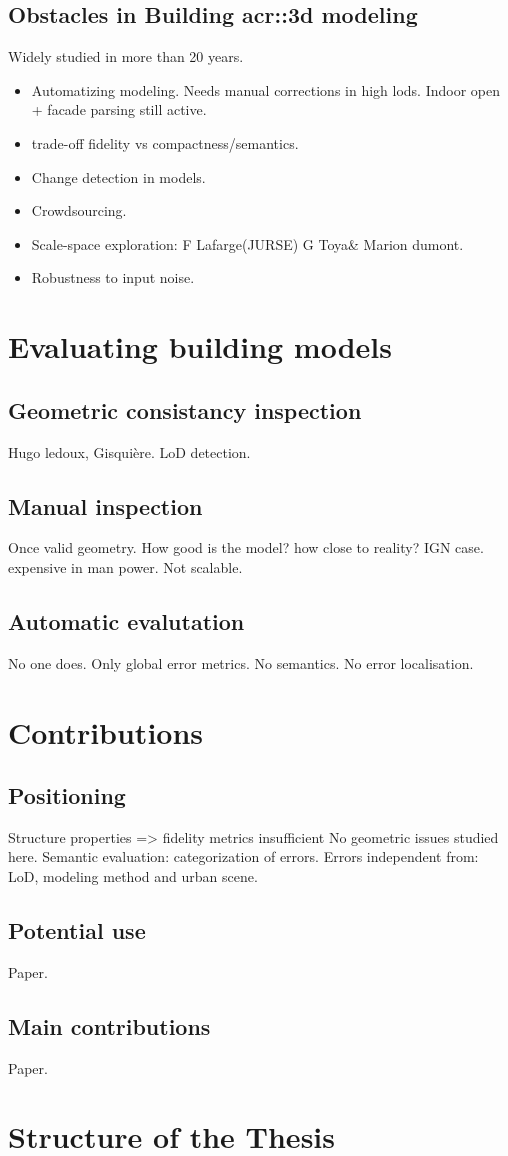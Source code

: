     \subsection{Obstacles in Building \gls{acr::3d} modeling}
        \label{subsec::introduction::urban_3d_reconstruction::challenges}
        Widely studied in more than 20 years.\\
        \begin{itemize}
            \item Automatizing modeling. Needs manual corrections in high lods. Indoor open + facade parsing still active.
            \item trade-off fidelity vs compactness/semantics.
            \item Change detection in models.
            \item Crowdsourcing.
            \item Scale-space exploration: F Lafarge(JURSE) G Toya\& Marion dumont.
            \item Robustness to input noise.
        \end{itemize}
\section{Evaluating building models}
    \label{sec::introduction::building_model_evaluation}
    \subsection{Geometric consistancy inspection}
        Hugo ledoux, Gisquière. LoD detection.
    \subsection{Manual inspection}
        Once valid geometry. How good is the model? how close to reality?
        IGN case.
        expensive in man power. Not scalable.
    \subsection{Automatic evalutation}
        No one does. Only global error metrics. No semantics. No error localisation.
\section{Contributions}
    \label{sec::introduction::contributions}
    \subsection{Positioning}
        Structure properties => fidelity metrics insufficient
        No geometric issues studied here.
        Semantic evaluation: categorization of errors.
        Errors independent from: LoD, modeling method and urban scene.
    \subsection{Potential use}
        Paper.
    \subsection{Main contributions}
        Paper.
\section{Structure of the Thesis}
    \label{sec::introduction::structure_of_thesis}
